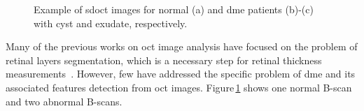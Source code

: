 \begin{figure}
\begin{center}
\hspace*{\fill}
\end{center}
\caption{ Example of \ac{sdoct} images for normal (a) and \ac{dme} patients (b)-(c) with cyst and exudate, respectively.}
\label{fig:dme-normal}
\end{figure}
Many of the previous works on \ac{oct} image analysis have focused on the problem of retinal layers segmentation, which is a necessary step for retinal thickness measurements~\cite{Chiu2010,Kafieh2013}.
However, few have addressed the specific problem of \ac{dme} and its associated features detection from \ac{oct} images.
Figure\,\ref{fig:dme-normal} shows one normal B-scan and two abnormal B-scans.

